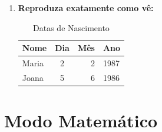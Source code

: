 \documentclass[13pt]{article}
\begin{document}
\begin{enumerate}
\item \textbf{Reproduza exatamente como vê:}

\begin{table}[h]
\caption{Datas de Nascimento} \begin{center}
\begin{tabular}{| lcr | l |} \hline
Nome & Dia & Mês & Ano \\ \hline
Maria & 2 & 2 & 1987 \\
Joana & 5 & 6 & 1986 \\ \hline
\end{tabular}
\end{center}
\end{table}
\end{enumerate}

\newpage
\section*{\huge{Modo Matemático}}
\end{document}
